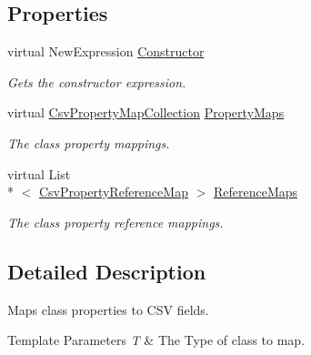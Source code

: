 \subsection*{Properties}
\begin{DoxyCompactItemize}
\item 
virtual New\-Expression \hyperlink{a00040_ae8038b36db7584ef1a73852fcc46404b}{Constructor}
\begin{DoxyCompactList}\small\item\em Gets the constructor expression. \end{DoxyCompactList}\item 
virtual \hyperlink{a00051}{Csv\-Property\-Map\-Collection} \hyperlink{a00040_a9580e897abcba144f3101eb983348e25}{Property\-Maps}
\begin{DoxyCompactList}\small\item\em The class property mappings. \end{DoxyCompactList}\item 
virtual List\\*
$<$ \hyperlink{a00055}{Csv\-Property\-Reference\-Map} $>$ \hyperlink{a00040_a6dfbf8f743b16d2ec83edef865ea2d9e}{Reference\-Maps}
\begin{DoxyCompactList}\small\item\em The class property reference mappings. \end{DoxyCompactList}\end{DoxyCompactItemize}


\subsection{Detailed Description}
Maps class properties to C\-S\-V fields. 


\begin{DoxyTemplParams}{Template Parameters}
{\em T} & The Type of class to map.\\
\hline
\end{DoxyTemplParams}


